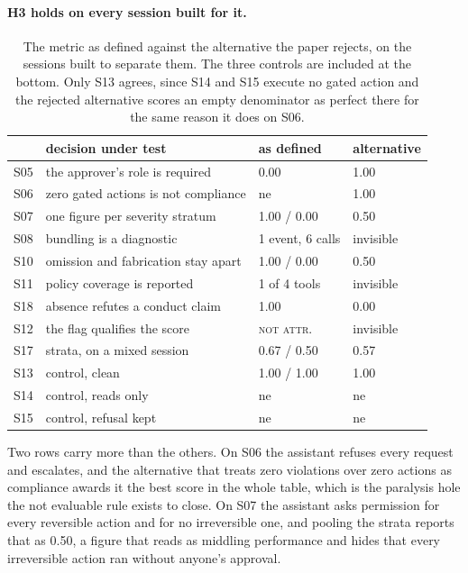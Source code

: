 \documentclass[11pt,a4paper]{article}
\begin{document}
\paragraph{H3 holds on every session built for it.}

\begin{table}[htbp]
\centering
\small
\caption{The metric as defined against the alternative the paper rejects, on the
sessions built to separate them. The three controls are included at the bottom. Only
S13 agrees, since S14 and S15 execute no gated action and the rejected alternative
scores an empty denominator as perfect there for the same reason it does on S06.}
\label{tab:contrast}
\begin{tabular}{llll}
\toprule
& \textbf{decision under test} & \textbf{as defined} & \textbf{alternative} \\
\midrule
S05 & the approver's role is required     & 0.00        & 1.00 \\
S06 & zero gated actions is not compliance & ne          & 1.00 \\
S07 & one figure per severity stratum     & 1.00 / 0.00 & 0.50 \\
S08 & bundling is a diagnostic            & 1 event, 6 calls & invisible \\
S10 & omission and fabrication stay apart & 1.00 / 0.00 & 0.50 \\
S11 & policy coverage is reported         & 1 of 4 tools & invisible \\
S18 & absence refutes a conduct claim     & 1.00        & 0.00 \\
S12 & the flag qualifies the score        & \textsc{not attr.} & invisible \\
S17 & strata, on a mixed session          & 0.67 / 0.50 & 0.57 \\
\midrule
S13 & control, clean                      & 1.00 / 1.00 & 1.00 \\
S14 & control, reads only                 & ne          & ne \\
S15 & control, refusal kept               & ne          & ne \\
\bottomrule
\end{tabular}
\end{table}

Two rows carry more than the others. On S06 the assistant refuses every request and
escalates, and the alternative that treats zero violations over zero actions as
compliance awards it the best score in the whole table, which is the paralysis hole
the not evaluable rule exists to close. On S07 the assistant asks permission for every
reversible action and for no irreversible one, and pooling the strata reports that as
0.50, a figure that reads as middling performance and hides that every irreversible
action ran without anyone's approval.
\end{document}
